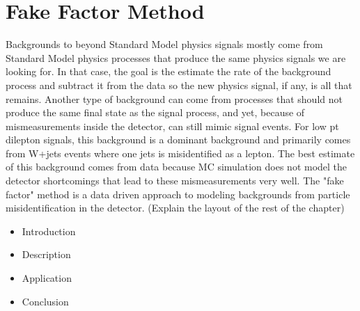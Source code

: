 \chapter{Fake Factor Method}
Backgrounds to beyond Standard Model physics signals mostly come from Standard Model physics processes that produce the same physics signals we are looking for.  In that case, the goal is the estimate the rate of the background process and subtract it from the data so the new physics signal, if any, is all that remains.  Another type of background can come from processes that should not produce the same final state as the signal process, and yet, because of mismeasurements inside the detector, can still mimic signal events.  For low pt dilepton signals, this background is a dominant background and primarily comes from W+jets events where one jets is misidentified as a lepton.   The best estimate of this background comes from data because MC simulation does not model the detector shortcomings that lead to these mismeasurements very well.  The "fake factor" method is a data driven approach to modeling backgrounds from particle misidentification in the detector.
(Explain the layout of the rest of the chapter)
\begin{itemize}
\item Introduction
\item Description
\item Application
\item Conclusion
\end{itemize}

